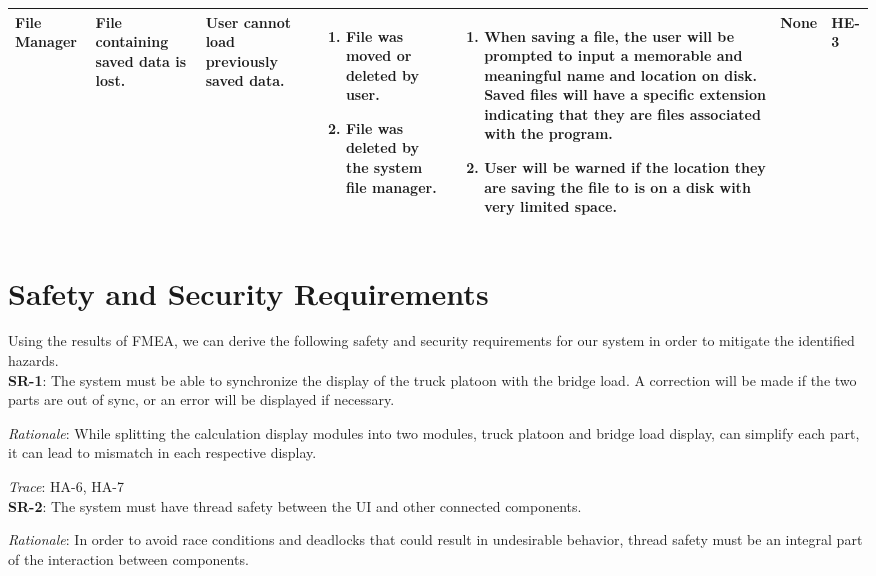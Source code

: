 \documentclass{article}
\begin{document}
\begin{landscape}
\begin{longtable}{|p{} | p{} | p{} | p{} | p{} | p{} | p{}|}
  \hline

  File Manager & File containing saved data is lost. & User cannot load previously saved data. &
  \begin{enumerate}[leftmargin=*, label={\alph*.}, itemsep=1pt, topsep=0pt, partopsep=0pt] 
    \item File was moved or deleted by user.
    \item File was deleted by the system file manager.
  \end{enumerate} &
  \begin{enumerate}[leftmargin=*, label={\alph*.}, itemsep=1pt, topsep=0pt, partopsep=0pt] 
    \item When saving a file, the user will be prompted to input a memorable and meaningful name and location on disk. Saved files will have a specific extension indicating that they are files associated with the program.
    \item User will be warned if the location they are saving the file to is on a disk with very limited space.
  \end{enumerate} & 
  None & HE-3 \\
  \hline
\end{longtable}
\end{landscape}

\newpage

\section{Safety and Security Requirements}
Using the results of FMEA, we can derive the following safety and security requirements for our system in order to 
mitigate the identified hazards. \\

\textbf{SR-1}:
The system must be able to synchronize the display of the truck platoon with the bridge load. A correction will be
made if the two parts are out of sync, or an error will be displayed if necessary. 

\emph{Rationale}: While splitting the calculation display modules into two modules, truck platoon and bridge load 
display, can simplify each part, it can lead to mismatch in each respective display.

\emph{Trace}: HA-6, HA-7\\

\textbf{SR-2}: 
The system must have thread safety between the UI and other connected components.

\emph{Rationale}: In order to avoid race conditions and deadlocks that could result in undesirable behavior,
thread safety must be an integral part of the interaction between components.
\end{document}
